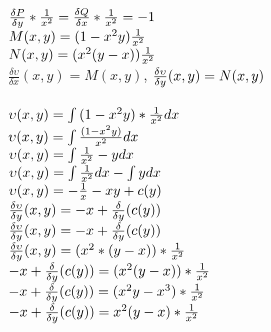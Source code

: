 \documentclass{article}
\begin{document}
\begin{center}
    {
    $
    \frac{\delta P}{\delta y} * \frac{1}{x^2} = \frac{\delta Q}{\delta x} * \frac{1}{x^2} = -1 \\
    $
    }\\
    {
    $
    M(x, y) = (1-x^2y)\frac{1}{x^2}\\$
    \\
    $N(x, y) = (x^2(y - x))\frac{1}{x^2}\\
    $
    }\\
    {
    $\frac{\delta \upsilon}{\delta x}(x, y) = M(x, y)$,
    }
    {
    $\frac{\delta \upsilon}{\delta y}(x, y) = N(x, y)\\$\\
    }\\
    {
    $
    \upsilon(x, y) = \int{(1 - x^2y)* \frac{1}{x^2}}dx\\
    $
    }\\
    {
    $
    \upsilon(x, y) = \int{\frac{(1 - x^2y)}{x^2}}dx\\
    $
    }\\
    {
    $
    \upsilon(x, y) = \int{\frac{1}{x^2} - y}dx\\
    $
    }\\
    {
    $
    \upsilon(x, y) = \int{\frac{1}{x^2}}dx - \int {y}dx\\
    $
    }\\
    {
    $
    \upsilon(x, y) = -\frac{1}{x} - xy + c(y)\\
    $
    }\\
    {
    $
    \frac{\delta \upsilon}{\delta y}(x, y) = -x + \frac{\delta}{\delta y}(c(y))\\
    $
    }\\
    {
    $
    \frac{\delta \upsilon}{\delta y}(x, y) = -x + \frac{\delta}{\delta y}(c(y))\\
    $
    }\\
    {
    $
    \frac{\delta \upsilon}{\delta y}(x, y) = (x^2 * (y - x))*\frac{1}{x^2}\\
    $
    }\\
    {
    $
    -x + \frac{\delta}{\delta y} (c(y)) = (x^2(y - x))* \frac{1}{x^2}\\
    $
    }\\
    {
    $
    -x + \frac{\delta}{\delta y} (c(y)) = (x^2y - x^3)* \frac{1}{x^2}\\
    $
    }\\
    {
    $
    -x + \frac{\delta}{\delta y} (c(y)) = x^2(y - x)* \frac{1}{x^2}\\
    $
    }\\

\end{center}
\end{document}
